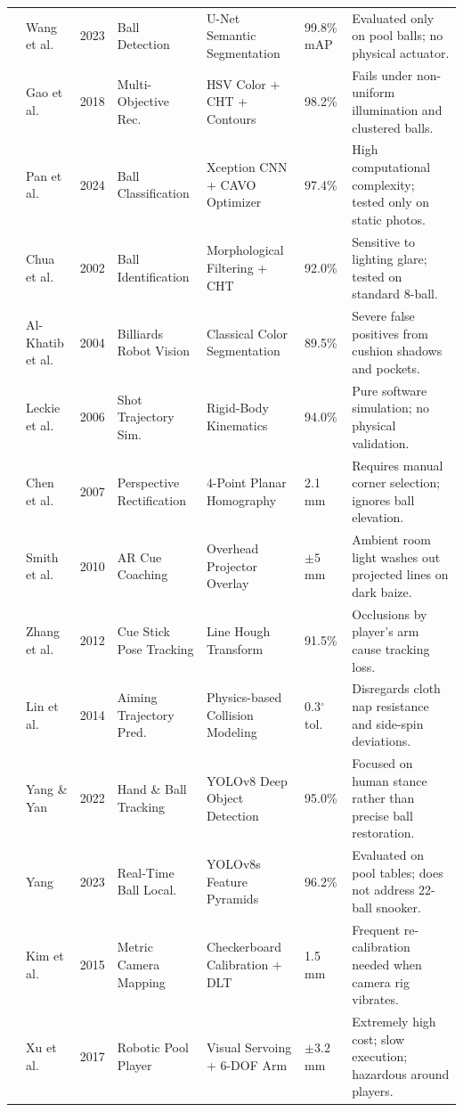 \begin{footnotesize}
\begin{longtable}{|c|p{1.7cm}|c|p{2.1cm}|p{2.6cm}|p{1.2cm}|p{2.9cm}|}
\cite{ref1} & Wang et al. & 2023 & Ball Detection & U-Net Semantic Segmentation & 99.8\% mAP & Evaluated only on pool balls; no physical actuator. \\
\cite{ref2} & Gao et al. & 2018 & Multi-Objective Rec. & HSV Color + CHT + Contours & 98.2\% & Fails under non-uniform illumination and clustered balls. \\
\cite{ref3} & Pan et al. & 2024 & Ball Classification & Xception CNN + CAVO Optimizer & 97.4\% & High computational complexity; tested only on static photos. \\
\cite{ref4} & Chua et al. & 2002 & Ball Identification & Morphological Filtering + CHT & 92.0\% & Sensitive to lighting glare; tested on standard 8-ball. \\
\cite{ref5} & Al-Khatib et al. & 2004 & Billiards Robot Vision & Classical Color Segmentation & 89.5\% & Severe false positives from cushion shadows and pockets. \\
\cite{ref6} & Leckie et al. & 2006 & Shot Trajectory Sim. & Rigid-Body Kinematics & 94.0\% & Pure software simulation; no physical validation. \\
\cite{ref7} & Chen et al. & 2007 & Perspective Rectification & 4-Point Planar Homography & 2.1 mm & Requires manual corner selection; ignores ball elevation. \\
\cite{ref8} & Smith et al. & 2010 & AR Cue Coaching & Overhead Projector Overlay & $\pm 5$ mm & Ambient room light washes out projected lines on dark baize. \\
\cite{ref9} & Zhang et al. & 2012 & Cue Stick Pose Tracking & Line Hough Transform & 91.5\% & Occlusions by player's arm cause tracking loss. \\
\cite{ref10} & Lin et al. & 2014 & Aiming Trajectory Pred. & Physics-based Collision Modeling & 0.3$^\circ$ tol. & Disregards cloth nap resistance and side-spin deviations. \\
\cite{ref11} & Yang \& Yan & 2022 & Hand \& Ball Tracking & YOLOv8 Deep Object Detection & 95.0\% & Focused on human stance rather than precise ball restoration. \\
\cite{ref12} & Yang & 2023 & Real-Time Ball Local. & YOLOv8s Feature Pyramids & 96.2\% & Evaluated on pool tables; does not address 22-ball snooker. \\
\cite{ref13} & Kim et al. & 2015 & Metric Camera Mapping & Checkerboard Calibration + DLT & 1.5 mm & Frequent re-calibration needed when camera rig vibrates. \\
\cite{ref14} & Xu et al. & 2017 & Robotic Pool Player & Visual Servoing + 6-DOF Arm & $\pm 3.2$ mm & Extremely high cost; slow execution; hazardous around players. \\

\end{longtable}
\end{footnotesize}
